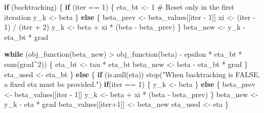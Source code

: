\documentclass[
  letterpaper,
  DIV=11,
  numbers=noendperiod]{scrartcl}
\newenvironment{Shaded}{\begin{snugshade}}{\end{snugshade}}
\newcommand{\CommentTok}[1]{\textcolor[rgb]{0.37,0.37,0.37}{#1}}
\newcommand{\ControlFlowTok}[1]{\textcolor[rgb]{0.00,0.23,0.31}{\textbf{#1}}}
\newcommand{\DecValTok}[1]{\textcolor[rgb]{0.68,0.00,0.00}{#1}}
\newcommand{\FunctionTok}[1]{\textcolor[rgb]{0.28,0.35,0.67}{#1}}
\newcommand{\NormalTok}[1]{\textcolor[rgb]{0.00,0.23,0.31}{#1}}
\newcommand{\OtherTok}[1]{\textcolor[rgb]{0.00,0.23,0.31}{#1}}
\newcommand{\SpecialCharTok}[1]{\textcolor[rgb]{0.37,0.37,0.37}{#1}}
\newcommand{\StringTok}[1]{\textcolor[rgb]{0.13,0.47,0.30}{#1}}
\begin{document}
\begin{Shaded}
\begin{Highlighting}[]
    \ControlFlowTok{if}\NormalTok{ (backtracking) \{}
      \ControlFlowTok{if}\NormalTok{ (iter }\SpecialCharTok{==} \DecValTok{1}\NormalTok{) \{}
\NormalTok{        eta\_bt }\OtherTok{\textless{}{-}} \DecValTok{1} \CommentTok{\# Reset only in the first iteration}
\NormalTok{        y\_k }\OtherTok{\textless{}{-}}\NormalTok{ beta}
\NormalTok{      \}}
      \ControlFlowTok{else}\NormalTok{ \{}
\NormalTok{        beta\_prev }\OtherTok{\textless{}{-}}\NormalTok{ beta\_values[[iter }\SpecialCharTok{{-}} \DecValTok{1}\NormalTok{]]}
\NormalTok{        xi }\OtherTok{\textless{}{-}}\NormalTok{ (iter }\SpecialCharTok{{-}} \DecValTok{1}\NormalTok{) }\SpecialCharTok{/}\NormalTok{ (iter }\SpecialCharTok{+} \DecValTok{2}\NormalTok{)}
\NormalTok{        y\_k }\OtherTok{\textless{}{-}}\NormalTok{ beta }\SpecialCharTok{+}\NormalTok{ xi }\SpecialCharTok{*}\NormalTok{ (beta }\SpecialCharTok{{-}}\NormalTok{ beta\_prev)}
\NormalTok{      \}}
\NormalTok{      beta\_new }\OtherTok{\textless{}{-}}\NormalTok{ y\_k }\SpecialCharTok{{-}}\NormalTok{ eta\_bt }\SpecialCharTok{*}\NormalTok{ grad}
      
      \ControlFlowTok{while}\NormalTok{ (}\FunctionTok{obj\_function}\NormalTok{(beta\_new) }\SpecialCharTok{\textgreater{}} \FunctionTok{obj\_function}\NormalTok{(beta) }\SpecialCharTok{{-}}\NormalTok{ epsilon }\SpecialCharTok{*}\NormalTok{ eta\_bt }\SpecialCharTok{*} \FunctionTok{sum}\NormalTok{(grad}\SpecialCharTok{\^{}}\DecValTok{2}\NormalTok{)) \{}
\NormalTok{        eta\_bt }\OtherTok{\textless{}{-}}\NormalTok{ tau }\SpecialCharTok{*}\NormalTok{ eta\_bt}
\NormalTok{        beta\_new }\OtherTok{\textless{}{-}}\NormalTok{ beta }\SpecialCharTok{{-}}\NormalTok{ eta\_bt }\SpecialCharTok{*}\NormalTok{ grad}
\NormalTok{      \}}
\NormalTok{      eta\_used }\OtherTok{\textless{}{-}}\NormalTok{ eta\_bt}
\NormalTok{    \} }\ControlFlowTok{else}\NormalTok{ \{}
      \ControlFlowTok{if}\NormalTok{ (}\FunctionTok{is.null}\NormalTok{(eta)) }\FunctionTok{stop}\NormalTok{(}\StringTok{"When backtracking is FALSE, a fixed eta must be provided."}\NormalTok{)}
      \ControlFlowTok{if}\NormalTok{(iter }\SpecialCharTok{==} \DecValTok{1}\NormalTok{) \{}
\NormalTok{        y\_k }\OtherTok{\textless{}{-}}\NormalTok{ beta}
\NormalTok{      \} }\ControlFlowTok{else}\NormalTok{ \{}
\NormalTok{        beta\_prev }\OtherTok{\textless{}{-}}\NormalTok{ beta\_values[[iter }\SpecialCharTok{{-}} \DecValTok{1}\NormalTok{]]}
\NormalTok{        y\_k }\OtherTok{\textless{}{-}}\NormalTok{ beta }\SpecialCharTok{+}\NormalTok{ xi }\SpecialCharTok{*}\NormalTok{ (beta }\SpecialCharTok{{-}}\NormalTok{ beta\_prev)}
\NormalTok{      \}}
\NormalTok{      beta\_new }\OtherTok{\textless{}{-}}\NormalTok{ y\_k }\SpecialCharTok{{-}}\NormalTok{ eta }\SpecialCharTok{*}\NormalTok{ grad}
\NormalTok{      beta\_values[[iter}\SpecialCharTok{+}\DecValTok{1}\NormalTok{]] }\OtherTok{\textless{}{-}}\NormalTok{ beta\_new}
\NormalTok{      eta\_used }\OtherTok{\textless{}{-}}\NormalTok{ eta}
\NormalTok{    \}}
    

\end{Highlighting}
\end{Shaded}
\end{document}
